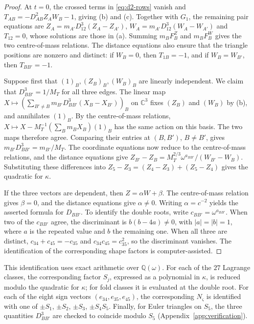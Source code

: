 \documentclass[Threeside,11pt]{article}
\theoremstyle{definition}
\theoremstyle{remark}
\numberwithin{equation}{section}
\newcommand{\C}{\mathbb C}\newcommand{\T}{\mathbb T}
\theoremstyle{remark}
\begin{document}
\begin{proof}
{At $t=0$, the crossed terms in \eqref{eq:d2-rows} vanish and
$T_{AB}=-D_{AB}^2Z_AW_B-1$, giving (b) and (c).  Together with $G_1$, the remaining pair
equations are $Z_A=m_{A'}D_{12}^3(Z_A-Z_{A'})$,
$W_A=m_{A'}D_{12}^3(W_A-W_{A'})$ and $T_{12}=0$, whose solutions are those in (a).
Summing $m_BF^Z_B$ and $m_BF^W_B$ gives the two centre-of-mass relations.
The distance equations also ensure that the triangle positions are nonzero and distinct:
if $W_B=0$, then $T_{1B}=-1$, and if $W_B=W_{B'}$, then $T_{BB'}=-1$.}

{Suppose first that $(1)_B,(Z_B)_B,(W_B)_B$ are linearly independent.
We claim that $D_{BB'}^3=1/M_T$ for all three edges.  The linear map
$X\mapsto(\sum_{B'\ne B}m_{B'}D_{BB'}^3(X_B-X_{B'}))_B$ on $\C^3$ fixes $(Z_B)$ and $(W_B)$
by (b), and annihilates $(1)_B$.  By the centre-of-mass relations,
$X\mapsto X-M_T^{-1}(\sum_Bm_BX_B)(1)_B$ has the same action on this basis.
The two maps therefore agree.  Comparing their entries at $(B,B')$, $B\ne B'$, gives
$m_{B'}D_{BB'}^3=m_{B'}/M_T$.
The coordinate equations now reduce to the centre-of-mass relations, and the distance
equations give $Z_{B'}-Z_B=M_T^{2/3}\omega^{a_{BB'}}/(W_{B'}-W_B)$.
Substituting these differences into $Z_5-Z_3=(Z_4-Z_3)+(Z_5-Z_4)$ gives the quadratic for
$\kappa$.}

{If the three vectors are dependent, then $Z=\alpha W+\beta$.
The centre-of-mass relation gives $\beta=0$, and the distance equations give $\alpha\ne0$.
Writing $\alpha=c^{-2}$ yields the asserted formula for $D_{BB'}$.
To identify the double roots, write $c_{BB'}=\omega^{a_{BB'}}$.
When two of the $c_{BB'}$ agree, the discriminant is $b(b-4a)\ne0$, with $|a|=|b|=1$,
where $a$ is the repeated value and $b$ the remaining one.
When all three are distinct, $c_{34}+c_{45}=-c_{35}$ and $c_{34}c_{45}=c_{35}^2$, so the
discriminant vanishes.  The identification of the corresponding shape factors is
computer-assisted.}
\end{proof}

{This identification uses exact arithmetic over $\mathbb Q(\omega)$.
For each of the $27$ Lagrange classes, the corresponding factor $S_j$, expressed as a
polynomial in $\kappa$, is reduced modulo the quadratic for $\kappa$; for fold classes it is
evaluated at the double root.  For each of the eight sign vectors $(e_{34},e_{35},e_{45})$,
the corresponding $N_\varsigma$ is identified with one of $\pm S_1$, $\pm S_2$, $\pm S_3$,
$\pm S_4S_5$.  Finally, for Euler triangles on $S_5$, the three quantities $D_{BB'}^3$ are
checked to coincide modulo $S_5$ (Appendix~\ref{app:verification}).}
\end{document}
